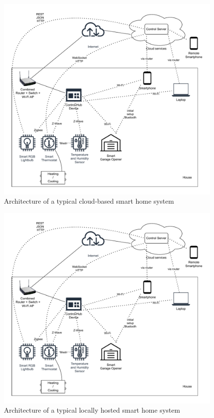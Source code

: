 \begin{figure}[!ht]
    \centering
    \includegraphics[page=1,keepaspectratio,width=150mm]{figures/sh_architecture_cloud.drawio.pdf}
    \caption{Architecture of a typical cloud-based smart home system}
    \label{fig:SHCloud}
\end{figure}

\begin{figure}[!ht]
    \centering
    \includegraphics[page=1,keepaspectratio,width=150mm]{figures/sh_architecture_cloud.drawio.pdf}
    \caption{Architecture of a typical locally hosted smart home system}
    \label{fig:SHLocal}
\end{figure}

